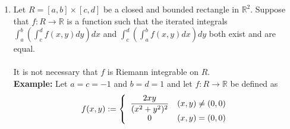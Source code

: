 \documentclass{article}
\begin{document}
\begin{enumerate}
	\item Let $R = [a, b] \times[c, d]$ be a closed and bounded rectangle in $\mathbb{R}^2.$ Suppose that $f:R\to\mathbb{R}$ is a function such that the iterated integrals $\displaystyle\int_{a}^{b} \left(\int_{c}^{d} f(x, y) dy\right) dx $ and $\displaystyle\int_{c}^{d} \left(\int_{a}^{b} f(x, y) dx\right) dy $ both exist and are equal.\\~\\
	 It is not necessary that $f$ is Riemann integrable on $R.$\\
	\textbf{Example:} Let $a = c = - 1$ and $b = d = 1$ and let $f:R \to \mathbb{R}$ be defined as
	\[f(x, y) := \left\{
	\begin{array}{c c}
		\dfrac{2xy}{(x^2 + y^2)^2} & (x, y) \neq (0, 0)\\
		0 & (x, y) = (0, 0)	
	\end{array}
	\right.\]

\end{enumerate}
\end{document}
